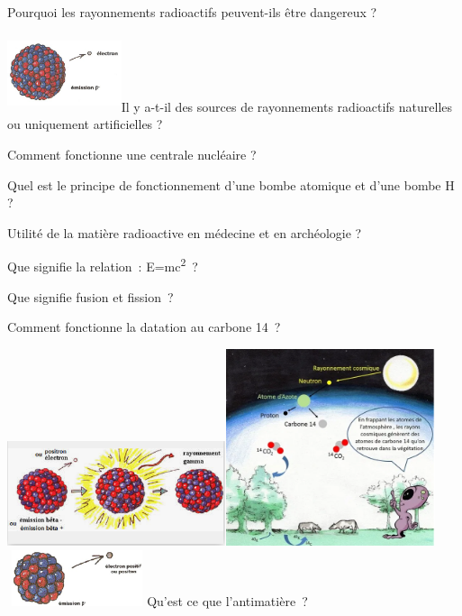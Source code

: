 Pourquoi les rayonnements radioactifs peuvent-ils être dangereux ?

\includegraphics[width=3.353cm,height=2.281cm]{Pictures/10000000000001C2000000FF8E8D24A81F4812A1.jpg}Il
y a-t-il des sources de rayonnements radioactifs naturelles ou
uniquement artificielles ?

Comment fonctionne une centrale nucléaire ?

Quel est le principe de fonctionnement d'une bombe atomique et d'une
bombe H ?

Utilité de la matière radioactive en médecine et en archéologie ?

Que signifie la relation~: E=mc\textsuperscript{2}~?

Que signifie fusion et fission~?

Comment fonctionne la datation au carbone 14~?

\includegraphics[width=6.421cm,height=3.082cm]{Pictures/100000010000016C000000AF47CF8A96233610D0.png}\includegraphics[width=6.144cm,height=5.784cm]{Pictures/1000000100000244000002230722677727C350FD.png}\includegraphics[width=4.105cm,height=1.646cm]{Pictures/10000000000001E0000000CD0A7EA401296A8942.jpg}Qu'est
ce que l'antimatière~?


